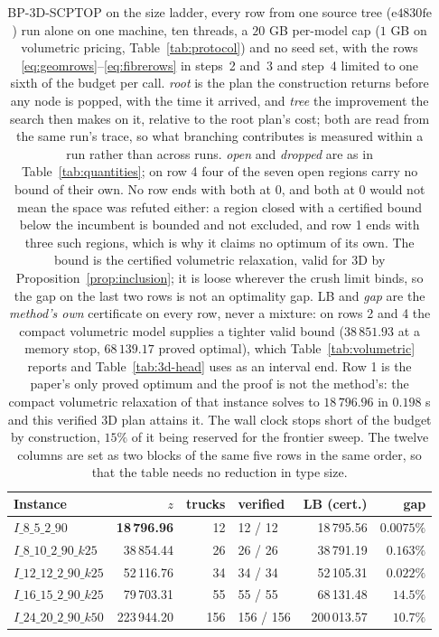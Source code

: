\begin{table}[!htbp]
\centering
\small
\caption{BP-3D-SCPTOP on the size ladder, every row from one source tree
($\mathrm{e}4830\mathrm{fe}$) run alone on one machine, ten threads, a
$20$ GB per-model cap ($1$ GB on volumetric pricing,
Table~\ref{tab:protocol}) and no seed set, with the rows
\eqref{eq:geomrows}--\eqref{eq:fibrerows} in steps~2 and~3 and step~4
limited to one sixth of the budget per call.
\emph{root} is the plan the construction returns before any node is
popped, with the time it arrived, and \emph{tree} the improvement the
search then makes on it, relative to the root plan's cost; both are
read from the same run's trace, so what branching contributes is
measured within a run rather than across runs. \emph{open} and
\emph{dropped} are as in Table~\ref{tab:quantities}; on row 4 four of
the seven open regions carry no bound of their own. No row ends
with both at $0$, and both at $0$ would not mean the space was refuted
either: a region closed with a certified bound below the incumbent is
bounded and not excluded, and row 1 ends with three such regions, which
is why it claims no optimum of its own. The bound is the certified
volumetric relaxation, valid for 3D by
Proposition~\ref{prop:inclusion}; it is loose wherever the crush limit
binds, so the gap on the last two rows is not an optimality gap. LB and
\emph{gap} are the \emph{method's own} certificate on every row, never a
mixture: on rows 2 and 4 the compact volumetric model supplies a tighter
valid bound ($38\,851.93$ at a memory stop, $68\,139.17$ proved
optimal), which Table~\ref{tab:volumetric} reports and
Table~\ref{tab:3d-head} uses as an interval end. Row 1 is the paper's
only proved optimum and the proof is not the method's: the compact
volumetric relaxation of that instance solves to $18\,796.96$ in
$0.198$ s and this verified 3D plan attains it. The wall clock stops short of the budget by construction, $15\%$ of it
being reserved for the frontier sweep. The twelve columns are set as
two blocks of the same five rows in the same order, so that the table
needs no reduction in type size.}
\label{tab:3d-onecommit}
\begin{tabular}{lrrlrr}
\toprule
Instance & $z$ & trucks & verified & LB (cert.) & gap \\
\midrule
$I\_8\_5\_2\_90$        & \textbf{18\,796.96} & 12  & 12 / 12   & 18\,795.56 & $0.0075\%$ \\
$I\_8\_10\_2\_90\_k25$  & 38\,854.44 & 26  & 26 / 26   & 38\,791.19 & $0.163\%$ \\
$I\_12\_12\_2\_90\_k25$ & 52\,116.76 & 34  & 34 / 34   & 52\,105.31 & $0.022\%$ \\
$I\_16\_15\_2\_90\_k25$ & 79\,703.31 & 55  & 55 / 55   & 68\,131.48 & $14.5\%$ \\
$I\_24\_20\_2\_90\_k50$ & 223\,944.20 & 156 & 156 / 156 & 200\,013.57 & $10.7\%$ \\
\bottomrule
\end{tabular}


\end{table}
